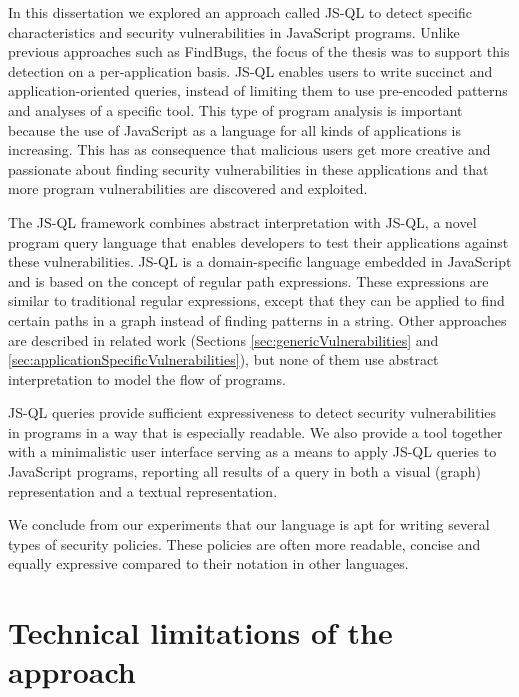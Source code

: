 In this dissertation we explored an approach called JS-QL to detect specific characteristics and security vulnerabilities in JavaScript programs. Unlike previous approaches such as FindBugs\cite{Findbugs}, the focus of the thesis was to support this detection on a per-application basis. JS-QL enables users to write succinct and application-oriented queries, instead of limiting them to use pre-encoded patterns and analyses of a specific tool. This type of program analysis is important because the use of JavaScript as a language for all kinds of applications is increasing. This has as consequence that malicious users get more creative and passionate about finding security vulnerabilities in these applications and that more program vulnerabilities are discovered and exploited. 

The JS-QL framework combines abstract interpretation with JS-QL, a novel program query language that enables developers to test their applications against these vulnerabilities. JS-QL is a domain-specific language embedded in JavaScript and is based on the concept of regular path expressions. These expressions are similar to traditional regular expressions, except that they can be applied to find certain paths in a graph instead of finding patterns in a string. Other approaches are described in related work (Sections \ref{sec:genericVulnerabilities} and \ref{sec:applicationSpecificVulnerabilities}), but none of them use abstract interpretation to model the flow of programs.

 JS-QL queries provide sufficient expressiveness to detect security vulnerabilities in programs in a way that is especially readable. We also provide a tool together with a minimalistic user interface serving as a means to apply JS-QL queries to JavaScript programs, reporting all results of a query in both a visual (graph) representation and a textual representation. 

 We conclude from our experiments that our language is apt for writing several types of security policies. These policies are often more readable, concise and equally expressive compared to their notation in other languages. 

\section{Technical limitations of the approach}

